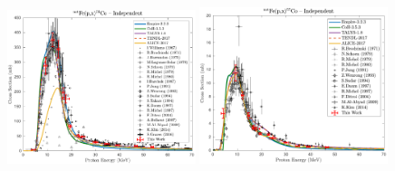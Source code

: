 \begin{figure}
 \includegraphics[width=0.49\textwidth]{./figures/56Co.pdf}
 \includegraphics[width=0.49\textwidth]{./figures/57Co.pdf}

\vspace{-20pt} 
\end{figure}



